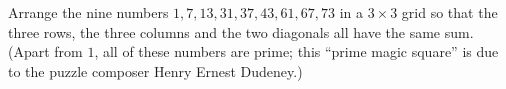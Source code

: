 Arrange the nine numbers $1, 7, 13, 31, 37, 43, 61, 67, 73$ in a $3\times3$ grid so that the three rows, the three columns and the two diagonals all have the same sum. (Apart from $1$, all of these numbers are prime; this ``prime magic square'' is due to the puzzle composer Henry Ernest Dudeney.)
